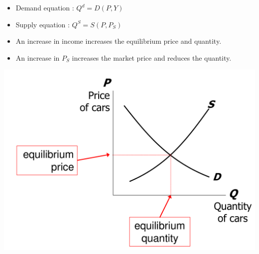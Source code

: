 \begin{minipage}{0.48\textwidth}
    \begin{itemize}
        \item Demand equation : $Q^d = D(P,Y)$
        \item Supply equation : $Q^S = S(P,P_S)$
        \item An increase in income increases the equilibrium price and quantity.
        \item An increase in $P_S$ increases the market price and reduces the quantity.
    \end{itemize}
\end{minipage}%
\begin{minipage}{0.48\textwidth}
    \centering
    \includegraphics[width=\linewidth]{image/equilibrium of cars market.png}
\end{minipage}

